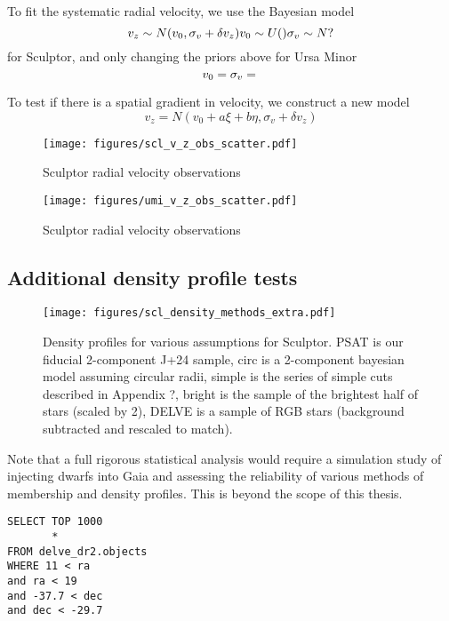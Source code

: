 To fit the systematic radial velocity, we use the Bayesian model \[
v_z \sim N(v_0, \sigma_v + \delta v_z)\\
v_0 \sim U() \\
\sigma_v \sim N?
\] for Sculptor, and only changing the priors above for Ursa Minor \[
v_0 = \\
\sigma_v = \\
\]

To test if there is a spatial gradient in velocity, we construct a new
model \[
v_z = N(v_0 + a \xi + b \eta, \sigma_v + \delta v_z)
\]

\begin{figure}
\centering
\texttt{[image: figures/scl\_v\_z\_obs\_scatter.pdf]}
\caption{Sculptor radial velocity observations}
\end{figure}

\begin{figure}
\centering
\texttt{[image: figures/umi\_v\_z\_obs\_scatter.pdf]}
\caption{Sculptor radial velocity observations}
\end{figure}

\subsection{Additional density profile
tests}\label{additional-density-profile-tests}

\begin{figure}
\centering
\texttt{[image: figures/scl\_density\_methods\_extra.pdf]}
\caption[Density profiles]{Density profiles for various assumptions for
Sculptor. PSAT is our fiducial 2-component J+24 sample, circ is a
2-component bayesian model assuming circular radii, simple is the series
of simple cuts described in Appendix ?, bright is the sample of the
brightest half of stars (scaled by 2), DELVE is a sample of RGB stars
(background subtracted and rescaled to
match).}\label{fig:sculptor_observed_profiles}
\end{figure}

Note that a full rigorous statistical analysis would require a
simulation study of injecting dwarfs into Gaia and assessing the
reliability of various methods of membership and density profiles. This
is beyond the scope of this thesis.

\begin{verbatim}
SELECT TOP 1000
       *
FROM delve_dr2.objects
WHERE 11 < ra
and ra < 19
and -37.7 < dec
and dec < -29.7
\end{verbatim}
